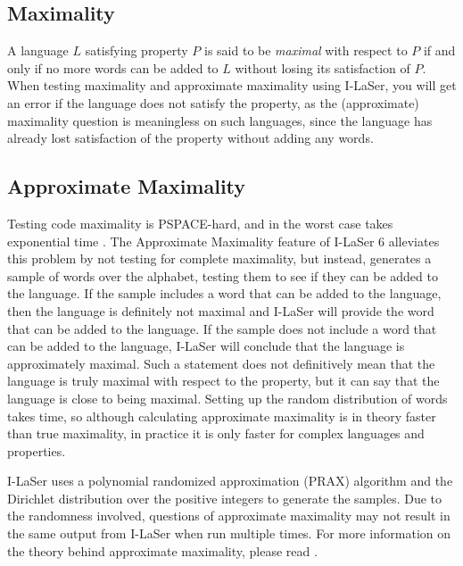 \documentclass{article}
\begin{document}
\subsection{Maximality}
\par A language $L$ satisfying property $P$ is said to be \textit{maximal} with respect to $P$ if and only if no more words can be added to $L$ without losing its satisfaction of $P$. When testing maximality and approximate maximality using I-LaSer, you will get an error if the language does not satisfy the property, as the (approximate) maximality question is meaningless on such languages, since the language has already lost satisfaction of the property without adding any words.

\subsection{Approximate Maximality}
\par Testing code maximality is PSPACE-hard, and in the worst case takes exponential time \cite{Approx}.
The Approximate Maximality feature of I-LaSer 6 alleviates this problem by not testing for complete maximality, but instead, generates a sample of words over the alphabet, testing them to see if they can be added to the language.
If the sample includes a word that can be added to the language, then the language is definitely not maximal and I-LaSer will provide the word that can be added to the language.
If the sample does not include a word that can be added to the language, I-LaSer will conclude that the language is approximately maximal.
Such a statement does not definitively mean that the language is truly maximal with respect to the property, but it can say that the language is close to being maximal.
Setting up the random distribution of words takes time, so although calculating approximate maximality is in theory faster than true maximality, in practice it is only faster for complex languages and properties.

\par I-LaSer uses a polynomial randomized approximation (PRAX) algorithm and the Dirichlet distribution over the positive integers to generate the samples. Due to the randomness involved, questions of approximate maximality may not result in the same output from I-LaSer when run multiple times. For more information on the theory behind approximate maximality, please read \cite{Approx}.

\end{document}
